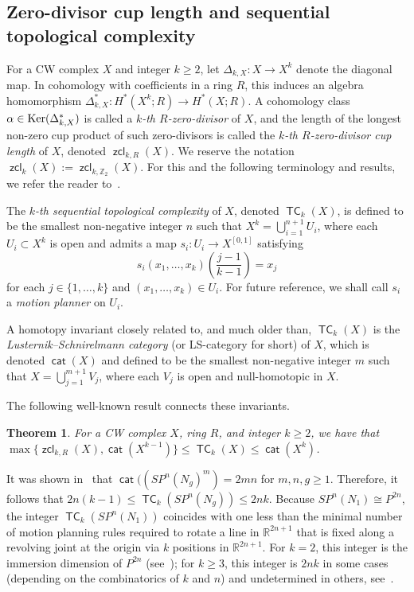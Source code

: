\documentclass[amscd,amssymb,verbatim,10pt]{amsart}
\numberwithin{equation}{section}
\theoremstyle{plain}
\newtheorem{thm}{Theorem}[section]
\theoremstyle{definition}
\DeclareMathOperator{\cat}{{\mathsf{cat}}}
\DeclareMathOperator{\TC}{{\mathsf{TC}}}
\DeclareMathOperator{\zcl}{{\mathsf{zcl}}}
\DeclareMathOperator{\Ker}{{\rm Ker}}
\def\Z{{\mathbb Z}}
\def\R{{\mathbb R}}
\begin{document}
\subsection{Zero-divisor cup length and sequential topological complexity}\label{subsec: zero div} 
For a CW complex $X$ and integer $k\ge 2$, let $\Delta_{k,X}\colon X\to X^k$ denote the diagonal map. In cohomology with coefficients in a ring $R$, this induces an algebra homomorphism $\Delta_{k,X}^*\colon H^*(X^k;R)\to H^*(X;R)$. A cohomology class $\alpha\in \Ker(\Delta_{k,X}^*)$ is called a \emph{$k$-th $R$-zero-divisor} of $X$, and the length of the longest non-zero cup product of such zero-divisors is called the \emph{$k$-th $R$-zero-divisor cup length} of $X$, denoted $\zcl_{k,R}(X)$. We reserve the notation $\zcl_k(X):=\zcl_{k,\Z_2}(X)$. For this and the following terminology and results, we refer the reader to~\cite{Far,Far2,Ru,BGRT}.


The \emph{$k$-th sequential topological complexity} of $X$, denoted $\TC_k(X)$, is defined to be the smallest non-negative integer $n$ such that $X^k=\bigcup_{i=1}^{n+1}U_i$, where each $U_i\subset X^k$ is open and admits a map $s_i\colon U_i\to X^{[0,1]}$ satisfying
\[
s_i(x_1,\ldots,x_k)\left(\frac{j-1}{k-1}\right)=x_j
\]
for each $j\in \{1,\ldots,k\}$ and $(x_1,\ldots,x_k)\in U_i$. For future reference, we shall call $s_i$ a \emph{motion planner} on $U_i$.

A homotopy invariant closely related to, and much older than, $\TC_k(X)$ is the \emph{Lusternik--Schnirelmann category} (or LS-category for short) of $X$, which is denoted $\cat(X)$ and defined to be the smallest non-negative integer $m$ such that $X=\bigcup_{j=1}^{m+1}V_j$, where each $V_j$ is open and null-homotopic in $X$.


The following well-known result connects these invariants.
\begin{thm}\label{thm: tc prelim}
For a CW complex $X$, ring $R$, and integer $k\ge 2$, we have that $\max\{\zcl_{k,R}(X),\cat(X^{k-1})\}\le\TC_k(X)\le\cat(X^k)$. 
\end{thm}

It was shown in~\cite{Ja} that $\cat((SP^n(N_g)^m)=2mn$ for $m,n,g\ge 1$. Therefore, it follows that $2n(k-1)\le\TC_k(SP^n(N_g))\le 2nk$. Because $SP^n(N_1)\cong P^{2n}$, the integer $\TC_k(SP^n(N_1))$ coincides with one less than the minimal number of motion planning rules required to rotate a line in $\R^{2n+1}$ that is fixed along a revolving joint at the origin via $k$ positions in $\R^{2n+1}$. For $k=2$, this integer is the immersion dimension of $P^{2n}$ (see~\cite{FTY}); for $k\ge 3$, this integer is $2nk$ in some cases (depending on the combinatorics of $k$ and $n$) and undetermined in others, see~\cite{Dav}.
\end{document}
